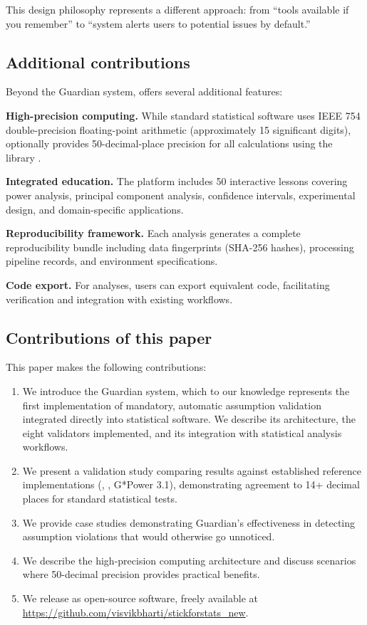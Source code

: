 \documentclass[article]{jss}
\begin{document}
This design philosophy represents a different approach: from ``tools available if you remember'' to ``system alerts users to potential issues by default.''

\subsection{Additional contributions}

Beyond the Guardian system,  offers several additional features:

\textbf{High-precision computing.} While standard statistical software uses IEEE 754 double-precision floating-point arithmetic (approximately 15 significant digits),  optionally provides 50-decimal-place precision for all calculations using the  library \citep{johansson2013mpmath}.

\textbf{Integrated education.} The platform includes 50 interactive lessons covering power analysis, principal component analysis, confidence intervals, experimental design, and domain-specific applications.

\textbf{Reproducibility framework.} Each analysis generates a complete reproducibility bundle including data fingerprints (SHA-256 hashes), processing pipeline records, and environment specifications.

\textbf{Code export.} For analyses, users can export equivalent  code, facilitating verification and integration with existing workflows.

\subsection{Contributions of this paper}

This paper makes the following contributions:

\begin{enumerate}
\item We introduce the Guardian system, which to our knowledge represents the first implementation of mandatory, automatic assumption validation integrated directly into statistical software. We describe its architecture, the eight validators implemented, and its integration with statistical analysis workflows.
\item We present a validation study comparing  results against established reference implementations (, , G*Power 3.1), demonstrating agreement to 14+ decimal places for standard statistical tests.
\item We provide case studies demonstrating Guardian's effectiveness in detecting assumption violations that would otherwise go unnoticed.
\item We describe the high-precision computing architecture and discuss scenarios where 50-decimal precision provides practical benefits.
\item We release  as open-source software, freely available at \url{https://github.com/visvikbharti/stickforstats_new}.
\end{enumerate}
\end{document}
